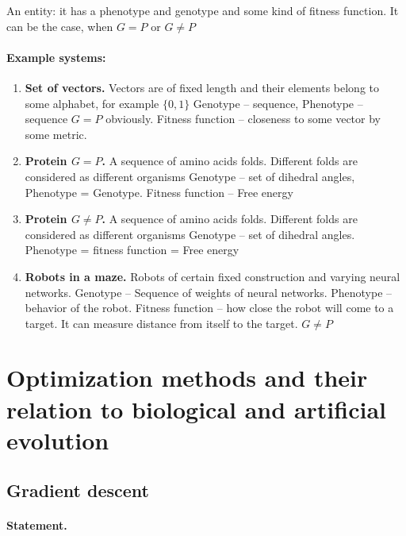 \documentclass[12pt]{paper}
\begin{document}
 An entity: it has a phenotype and genotype and some kind of fitness function. It can be the case, 
when $G=P$ or $G\neq P$
 \paragraph{Example systems:}
\begin{enumerate}
 \item \textbf{Set of vectors.} Vectors are of fixed length and their elements belong to some 
alphabet, for example $\{0,1\}$
  \subitem Genotype -- sequence, Phenotype -- sequence $G=P$ obviously. Fitness function -- 
closeness to some vector by some metric.
  \item \textbf{Protein $G=P$.} A sequence of amino acids folds. Different folds are considered as 
different organisms
  \subitem Genotype -- set of dihedral angles, Phenotype = Genotype. Fitness function -- Free energy
  \item \textbf{Protein $G\neq P$.} A sequence of amino acids folds. Different folds are considered 
as different organisms
  \subitem Genotype -- set of dihedral angles. Phenotype = fitness function = Free energy
  \item \textbf{Robots in a maze.} Robots of certain fixed construction and varying neural networks.
  \subitem Genotype -- Sequence of weights of neural networks. Phenotype -- behavior of the robot. 
Fitness function -- how close the robot will come to a target. It can measure distance from 
itself to the target. $G\neq P$
\end{enumerate}

 
 
 \section{Optimization methods and their relation to biological and artificial evolution}
 
 \subsection{Gradient descent}
 
 \paragraph{Statement.} 
\end{document}
